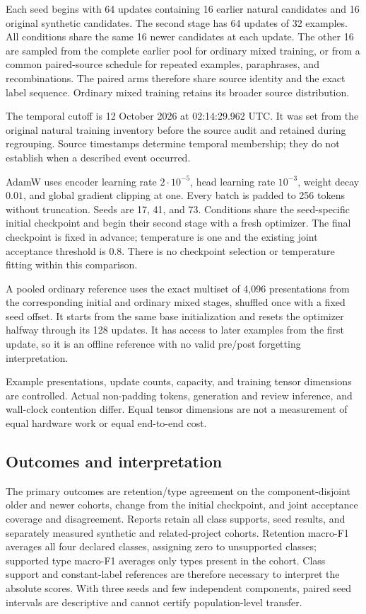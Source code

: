 Each seed begins with 64 updates containing 16 earlier natural candidates and 16 original synthetic candidates. The second stage has 64 updates of 32 examples. All conditions share the same 16 newer candidates at each update. The other 16 are sampled from the complete earlier pool for ordinary mixed training, or from a common paired-source schedule for repeated examples, paraphrases, and recombinations. The paired arms therefore share source identity and the exact label sequence. Ordinary mixed training retains its broader source distribution.

The temporal cutoff is 12 October 2026 at 02:14:29.962 UTC. It was set from the original natural training inventory before the source audit and retained during regrouping. Source timestamps determine temporal membership; they do not establish when a described event occurred.

AdamW uses encoder learning rate $2\cdot10^{-5}$, head learning rate $10^{-3}$, weight decay $0.01$, and global gradient clipping at one. Every batch is padded to 256 tokens without truncation. Seeds are 17, 41, and 73. Conditions share the seed-specific initial checkpoint and begin their second stage with a fresh optimizer. The final checkpoint is fixed in advance; temperature is one and the existing joint acceptance threshold is $0.8$. There is no checkpoint selection or temperature fitting within this comparison.

A pooled ordinary reference uses the exact multiset of 4,096 presentations from the corresponding initial and ordinary mixed stages, shuffled once with a fixed seed offset. It starts from the same base initialization and resets the optimizer halfway through its 128 updates. It has access to later examples from the first update, so it is an offline reference with no valid pre/post forgetting interpretation.

Example presentations, update counts, capacity, and training tensor dimensions are controlled. Actual non-padding tokens, generation and review inference, and wall-clock contention differ. Equal tensor dimensions are not a measurement of equal hardware work or equal end-to-end cost.

\subsection{Outcomes and interpretation}
The primary outcomes are retention/type agreement on the component-disjoint older and newer cohorts, change from the initial checkpoint, and joint acceptance coverage and disagreement. Reports retain all class supports, seed results, and separately measured synthetic and related-project cohorts. Retention macro-F1 averages all four declared classes, assigning zero to unsupported classes; supported type macro-F1 averages only types present in the cohort. Class support and constant-label references are therefore necessary to interpret the absolute scores. With three seeds and few independent components, paired seed intervals are descriptive and cannot certify population-level transfer.

